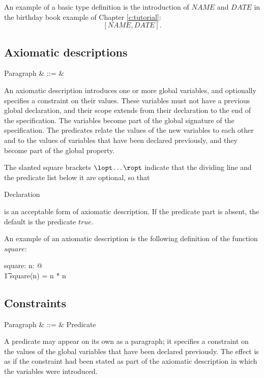 An example of a basic type definition is the introduction of $NAME$
and $DATE$ in the birthday book example of Chapter \ref{c:tutorial}:
\[ [NAME, DATE]. \]

\subsection{Axiomatic descriptions}\label{ss:axdef}

\begin{syntax}
    Paragraph & ::= &
	\qquad {}
\end{syntax}
An axiomatic description introduces one
or more global variables, and optionally specifies a constraint on
their values. These variables must not have a previous global
declaration, and their scope extends from their declaration to the
end of the specification. The variables become part of the global
signature of the specification. The predicates relate the values of
the new variables to each other and to the values of
variables that have been declared previously, and they become part
of the global property.  

The slanted square brackets \(\lopt\ldots\ropt\) indicate
that the dividing line and the predicate list below it are optional,
so that
\begin{axdef}
        \sf Declaration
\end{axdef}
is an acceptable form of axiomatic description. If the predicate
part is absent, the default is the predicate $true$.

An example of an axiomatic description is the following definition of
the function $square$:
\begin{axdef}
	square: \nat \fun \nat
\where
	\forall n: \nat @ \\
\t1		square(n) = n * n
\end{axdef}

\subsection{Constraints}\label{ss:constraint}

\begin{syntax}
       Paragraph & ::= & Predicate
\end{syntax}
A predicate may appear on its own as a
paragraph; it specifies a constraint
on the values of the global variables that have been declared
previously.  The effect is as if the constraint had been stated as
part of the axiomatic description in which the variables were
introduced.


